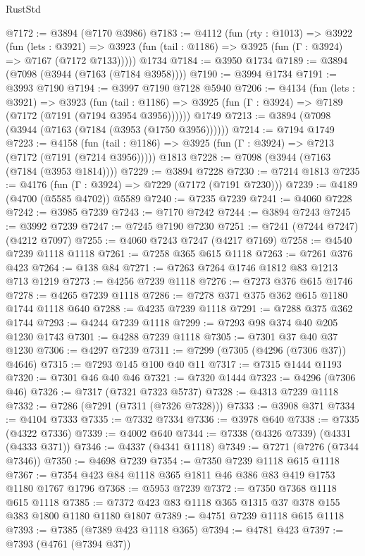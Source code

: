\begin{lexlean}{RustStd}
\begin{coremodule}
{\begin{coremodule}
{{{{{{{{{{{{{{{{{{{{{{{{{{{{{{{{@7172 := @3894 (@7170 @3986)
@7183 := @4112
    (fun (rty : @1013) =>
    @3922
      (fun (lets : @3921) =>
      @3923 (fun (tail : @1186) => @3925 (fun (Γ : @3924) => @7167 (@7172 @7133)))))
    @1734
@7184 := @3950 @1734
@7189 := @3894 (@7098 (@3944 (@7163 (@7184 @3958))))
@7190 := @3994 @1734
@7191 := @3993 @7190
@7194 := @3997 @7190 @7128 @5940
@7206 := @4134
    (fun (lets : @3921) =>
    @3923
      (fun (tail : @1186) => @3925 (fun (Γ : @3924) => @7189 (@7172 (@7191 (@7194 @3954 @3956))))))
    @1749
@7213 := @3894 (@7098 (@3944 (@7163 (@7184 (@3953 (@1750 @3956))))))
@7214 := @7194 @1749
@7223 := @4158
    (fun (tail : @1186) => @3925 (fun (Γ : @3924) => @7213 (@7172 (@7191 (@7214 @3956)))))
    @1813
@7228 := @7098 (@3944 (@7163 (@7184 (@3953 @1814))))
@7229 := @3894 @7228
@7230 := @7214 @1813
@7235 := @4176 (fun (Γ : @3924) => @7229 (@7172 (@7191 @7230)))
@7239 := @4189 (@4700 (@5585 @4702)) @5589
@7240 := @7235 @7239
@7241 := @4060 @7228
@7242 := @3985 @7239
@7243 := @7170 @7242
@7244 := @3894 @7243
@7245 := @3992 @7239
@7247 := @7245 @7190 @7230
@7251 := @7241 (@7244 @7247) (@4212 @7097)
@7255 := @4060 @7243 @7247 (@4217 @7169)
@7258 := @4540 @7239 @1118 @1118
@7261 := @7258 @365 @615 @1118
@7263 := @7261 @376 @423
@7264 := @138 @84
@7271 := @7263 @7264 @1746 @1812 @83 @1213 @713 @1219
@7273 := @4256 @7239 @1118
@7276 := @7273 @376 @615 @1746
@7278 := @4265 @7239 @1118
@7286 := @7278 @371 @375 @362 @615 @1180 @1744 @1118 @640
@7288 := @4235 @7239 @1118
@7291 := @7288 @375 @362 @1744
@7293 := @4244 @7239 @1118
@7299 := @7293 @98 @374 @40 @205 @1230 @1743
@7301 := @4288 @7239 @1118
@7305 := @7301 @37 @40 @37 @1230
@7306 := @4297 @7239
@7311 := @7299 (@7305 (@4296 (@7306 @37)) @4646)
@7315 := @7293 @145 @100 @40 @11
@7317 := @7315 @1444 @1193
@7320 := @7301 @46 @40 @46
@7321 := @7320 @1444
@7323 := @4296 (@7306 @46)
@7326 := @7317 (@7321 @7323 @5737)
@7328 := @4313 @7239 @1118
@7332 := @7286 (@7291 (@7311 (@7326 @7328)))
@7333 := @3908 @371
@7334 := @4104 @7333
@7335 := @7332 @7334
@7336 := @3978 @640
@7338 := @7335 (@4322 @7336)
@7339 := @4002 @640
@7344 := @7338 (@4326 @7339) (@4331 (@4333 @371))
@7346 := @4337 (@4341 @1118)
@7349 := @7271 (@7276 (@7344 @7346))
@7350 := @4698 @7239
@7354 := @7350 @7239 @1118 @615 @1118
@7367 := @7354 @423 @84 @1118 @365 @1811 @46 @386 @83 @419 @1753 @1180 @1767 @1796
@7368 := @5953 @7239
@7372 := @7350 @7368 @1118 @615 @1118
@7385 := @7372 @423 @83 @1118 @365 @1315 @37 @378 @155 @383 @1800 @1180 @1180 @1807
@7389 := @4751 @7239 @1118 @615 @1118
@7393 := @7385 (@7389 @423 @1118 @365)
@7394 := @4781 @423
@7397 := @7393 (@4761 (@7394 @37))
}}}}}}}}}}}}}}}}}}}}}}}}}}}}}}}}
\end{coremodule}}
\end{coremodule}
\end{lexlean}
